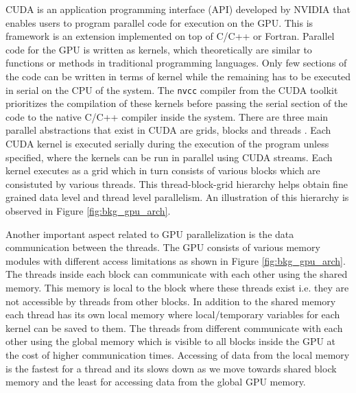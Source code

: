 \documentclass[preprint,10pt,authoryear,review]{elsarticle}
\begin{document}
\begin{linenumbers}
CUDA is an application programming interface (API) developed by NVIDIA \citep{NVIDIA2012} that enables 
users to program parallel code for execution on the GPU. This is framework is an 
extension implemented on top of C/C++ or Fortran. Parallel code for the GPU is written 
as kernels, which theoretically are similar to functions or methods in traditional 
programming languages. Only few sections of the code can be written in terms of kernel 
while the remaining has to be executed in serial on the CPU of the system. The \texttt{nvcc} 
compiler from the CUDA toolkit prioritizes the compilation of these kernels before 
passing the serial section of the code to the native C/C++ compiler inside the system. 
There are three main parallel abstractions that exist in CUDA are grids, blocks and 
threads \citep{santos2013}. Each CUDA kernel is executed serially during the execution 
of the program unless specified, where the kernels can be run in parallel using CUDA 
streams. Each kernel executes as a grid which in turn consists of various blocks which 
are consistuted by various threads. This thread-block-grid hierarchy helps obtain fine 
grained data level and thread level parallelism. An illustration of this hierarchy is 
observed in Figure \ref{fig:bkg_gpu_arch}.

Another important aspect related to GPU parallelization is the data communication between the threads. 
The GPU consists of various memory modules with different access limitations as shown in Figure 
\ref{fig:bkg_gpu_arch}. The threads inside each block can communicate with each other using the 
shared memory. This memory is local to the block where these threads exist i.e. they are not 
accessible by threads from other blocks. In addition to the shared memory each thread has its 
own local memory where local/temporary variables for each kernel can be saved to them. 
The threads from different communicate with each other using the global memory which is visible to 
all blocks inside the GPU at the cost of higher communication times. Accessing of data from the 
local memory is the fastest for a thread and its slows down as we move towards shared block memory 
and the least for accessing data from the global GPU memory. 



\end{linenumbers}
\end{document}
